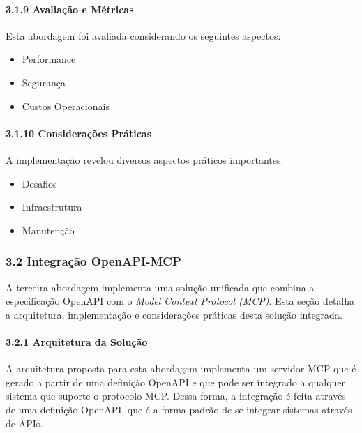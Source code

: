 \documentclass[
]{article}
\providecommand{\tightlist}{%
  \setlength{\itemsep}{0pt}\setlength{\parskip}{0pt}}
\begin{document}
\paragraph{3.1.9 Avaliação e
Métricas}\label{avaliauxe7uxe3o-e-muxe9tricas}

Esta abordagem foi avaliada considerando os seguintes aspectos:

\begin{itemize}
\tightlist
\item
  Performance
\item
  Segurança
\item
  Custos Operacionais
\end{itemize}

\paragraph{3.1.10 Considerações
Práticas}\label{considerauxe7uxf5es-pruxe1ticas}

A implementação revelou diversos aspectos práticos importantes:

\begin{itemize}
\tightlist
\item
  Desafios
\item
  Infraestrutura
\item
  Manutenção
\end{itemize}

\subsubsection{3.2 Integração
OpenAPI-MCP}\label{integrauxe7uxe3o-openapi-mcp}

A terceira abordagem implementa uma solução unificada que combina a
especificação OpenAPI com o \emph{Model Context Protocol (MCP)}. Esta
seção detalha a arquitetura, implementação e considerações práticas
desta solução integrada.

\paragraph{3.2.1 Arquitetura da
Solução}\label{arquitetura-da-soluuxe7uxe3o-1}

A arquitetura proposta para esta abordagem implementa um servidor MCP
que é gerado a partir de uma definição OpenAPI e que pode ser integrado
a qualquer sistema que suporte o protocolo MCP. Dessa forma, a
integração é feita através de uma definição OpenAPI, que é a forma
padrão de se integrar sistemas através de APIs.
\end{document}

